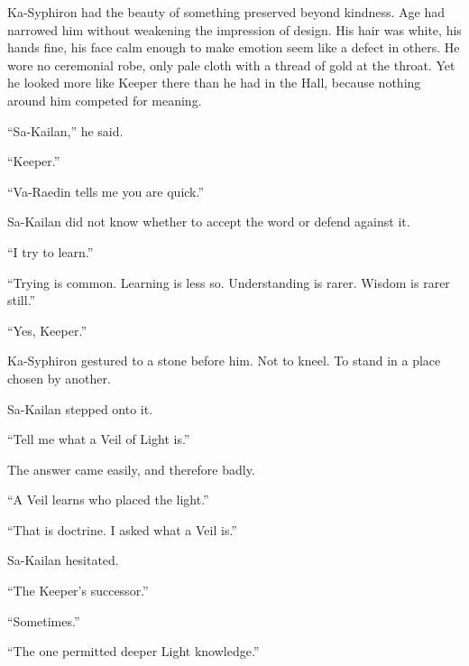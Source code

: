 Ka-Syphiron had the beauty of something preserved beyond kindness. Age had narrowed him without weakening the impression of design. His hair was white, his hands fine, his face calm enough to make emotion seem like a defect in others. He wore no ceremonial robe, only pale cloth with a thread of gold at the throat. Yet he looked more like Keeper there than he had in the Hall, because nothing around him competed for meaning.\par

“Sa-Kailan,” he said.\par

“Keeper.”\par

“Va-Raedin tells me you are quick.”\par

Sa-Kailan did not know whether to accept the word or defend against it.\par

“I try to learn.”\par

“Trying is common. Learning is less so. Understanding is rarer. Wisdom is rarer still.”\par

“Yes, Keeper.”\par

Ka-Syphiron gestured to a stone before him. Not to kneel. To stand in a place chosen by another.\par

Sa-Kailan stepped onto it.\par

“Tell me what a Veil of Light is.”\par

The answer came easily, and therefore badly.\par

“A Veil learns who placed the light.”\par

“That is doctrine. I asked what a Veil is.”\par

Sa-Kailan hesitated.\par

“The Keeper’s successor.”\par

“Sometimes.”\par

“The one permitted deeper Light knowledge.”\par

